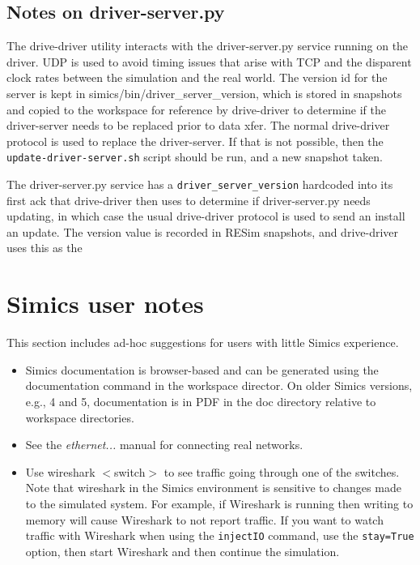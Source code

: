 \documentclass[titlepage]{article}
\begin{document}
\begin{appendices}
\subsection{Notes on driver-server.py}
The drive-driver utility interacts with the driver-server.py service running on the driver.  UDP is used to avoid timing issues that arise with TCP and the disparent
clock rates between the simulation and the real world.  The version id for the server is kept in simics/bin/driver\_server\_version, which is stored in snapshots
and copied to the workspace for reference by drive-driver to determine if the driver-server needs to be replaced prior to data xfer. The normal drive-driver protocol is used
to replace the driver-server.  If that is not possible, then the {\tt update-driver-server.sh} script should be run, and a new snapshot taken. 

The driver-server.py service has a {\tt driver\_server\_version} hardcoded into its first ack that
drive-driver then uses to determine if driver-server.py needs updating, in which case the usual drive-driver protocol is used to send an install an update.
The version value is recorded in RESim snapshots, and drive-driver uses this as the 

\section{Simics user notes}
This section includes ad-hoc suggestions for users with little Simics experience.
\begin{itemize}
\item Simics documentation is browser-based and can be generated using the documentation command in the workspace director.  On older Simics versions,
e.g., 4 and 5, documentation is in PDF in the doc directory relative to workspace directories.

\item See the \textit{ethernet...} manual for connecting real networks.

\item Use wireshark $<$switch$>$ to see traffic going through one of the switches. Note that wireshark in the Simics environment is sensitive to 
changes made to the simulated system.  For example, if Wireshark is running then writing to memory will cause Wireshark to not report traffic.  
If you want to watch traffic with Wireshark when using the {\tt injectIO} command, use the {\tt stay=True} option, then start Wireshark and then
continue the simulation.


\end{itemize}
\end{appendices}
\end{document}
